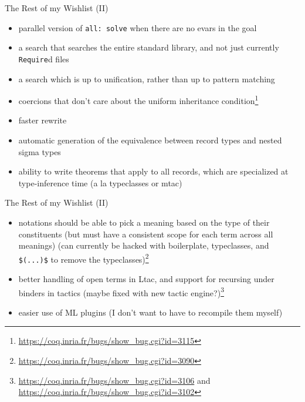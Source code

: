 \documentclass{beamer}
\begin{document}
\begin{frame}{The Rest of my Wishlist (II)}
\begin{itemize}
  \item
    parallel version of \texttt{all: solve} when there are no evars in the goal
  \item 
    a search that searches the entire standard library, and not just currently \texttt{Require}d files
  \item 
    a search which is up to unification, rather than up to pattern matching
  \item 
    coercions that don't care about the uniform inheritance condition\footnote{\url{https://coq.inria.fr/bugs/show\_bug.cgi?id=3115}}
  \item 
    faster rewrite
  \item 
    automatic generation of the equivalence between record types and nested sigma types
  \item 
    ability to write theorems that apply to all records, which are specialized at type-inference time (a la typeclasses or mtac)
\end{itemize}
\end{frame}

\begin{frame}{The Rest of my Wishlist (II)}
\begin{itemize}
  \item
    notations should be able to pick a meaning based on the type of their constituents (but must have a consistent scope for each term across all meanings) (can currently be hacked with boilerplate, typeclasses, and \texttt{\$(...)\$} to remove the typeclasses)\footnote{\url{https://coq.inria.fr/bugs/show\_bug.cgi?id=3090}}
  \item 
    better handling of open terms in Ltac, and support for recursing under binders in tactics (maybe fixed with new tactic engine?)\footnote{\url{https://coq.inria.fr/bugs/show\_bug.cgi?id=3106} and \url{https://coq.inria.fr/bugs/show\_bug.cgi?id=3102}}
  \item 
    easier use of ML plugins (I don't want to have to recompile them myself)
\end{itemize}
\end{frame}
\end{document}
